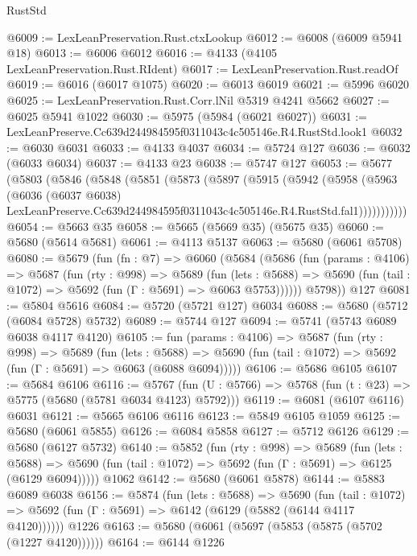 \begin{lexlean}{RustStd}
\begin{coremodule}
@6009 := LexLeanPreservation.Rust.ctxLookup
@6012 := @6008 (@6009 @5941 @18)
@6013 := @6006 @6012
@6016 := @4133 (@4105 LexLeanPreservation.Rust.RIdent)
@6017 := LexLeanPreservation.Rust.readOf
@6019 := @6016 (@6017 @1075)
@6020 := @6013 @6019
@6021 := @5996 @6020
@6025 := LexLeanPreservation.Rust.Corr.lNil @5319 @4241 @5662
@6027 := @6025 @5941 @1022
@6030 := @5975 (@5984 (@6021 @6027))
@6031 := LexLeanPreserve.Cc639d244984595f0311043c4c505146e.R4.RustStd.look1
@6032 := @6030 @6031
@6033 := @4133 @4037
@6034 := @5724 @127
@6036 := @6032 (@6033 @6034)
@6037 := @4133 @23
@6038 := @5747 @127
@6053 := @5677
    (@5803
      (@5846
        (@5848
          (@5851
            (@5873
              (@5897
                (@5915
                  (@5942
                    (@5958
                      (@5963
                        (@6036
                          (@6037 @6038)
                          LexLeanPreserve.Cc639d244984595f0311043c4c505146e.R4.RustStd.fal1)))))))))))
@6054 := @5663 @35
@6058 := @5665 (@5669 @35) (@5675 @35)
@6060 := @5680 (@5614 @5681)
@6061 := @4113 @5137
@6063 := @5680 (@6061 @5708)
@6080 := @5679
    (fun (fn : @7) =>
    @6060
      (@5684
        (@5686
          (fun (params : @4106) =>
          @5687
            (fun (rty : @998) =>
            @5689
              (fun (lets : @5688) =>
              @5690 (fun (tail : @1072) => @5692 (fun (Γ : @5691) => @6063 @5753))))))
        @5798))
    @127
@6081 := @5804 @5616
@6084 := @5720 (@5721 @127) @6034
@6088 := @5680 (@5712 (@6084 @5728) @5732)
@6089 := @5744 @127
@6094 := @5741 (@5743 @6089 @6038 @4117 @4120)
@6105 := fun (params : @4106) =>
  @5687
    (fun (rty : @998) =>
    @5689
      (fun (lets : @5688) =>
      @5690 (fun (tail : @1072) => @5692 (fun (Γ : @5691) => @6063 (@6088 @6094)))))
@6106 := @5686 @6105
@6107 := @5684 @6106
@6116 := @5767 (fun (U : @5766) => @5768 (fun (t : @23) => @5775 (@5680 (@5781 @6034 @4123) @5792)))
@6119 := @6081 (@6107 @6116) @6031
@6121 := @5665 @6106 @6116
@6123 := @5849 @6105 @1059
@6125 := @5680 (@6061 @5855)
@6126 := @6084 @5858
@6127 := @5712 @6126
@6129 := @5680 (@6127 @5732)
@6140 := @5852
    (fun (rty : @998) =>
    @5689
      (fun (lets : @5688) =>
      @5690 (fun (tail : @1072) => @5692 (fun (Γ : @5691) => @6125 (@6129 @6094)))))
    @1062
@6142 := @5680 (@6061 @5878)
@6144 := @5883 @6089 @6038
@6156 := @5874
    (fun (lets : @5688) =>
    @5690
      (fun (tail : @1072) => @5692 (fun (Γ : @5691) => @6142 (@6129 (@5882 (@6144 @4117 @4120))))))
    @1226
@6163 := @5680 (@6061 (@5697 (@5853 (@5875 (@5702 (@1227 @4120))))))
@6164 := @6144 @1226

\end{coremodule}
\end{lexlean}
